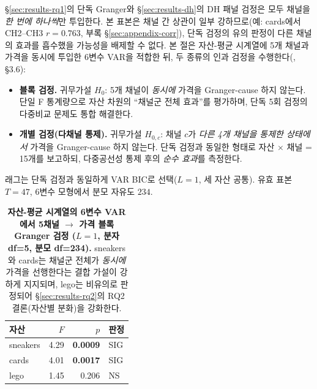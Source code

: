 \documentclass[11pt, a4paper, twocolumn]{article}
\begin{document}
\S\ref{sec:results-rq1}의 단독 Granger와 \S\ref{sec:results-dh}의 DH
패널 검정은 모두 채널을 \emph{한 번에 하나씩}만 투입한다. 본 표본은
채널 간 상관이 일부 강하므로(예: cards에서 CH2--CH3 $r=0.763$, 부록
\S\ref{sec:appendix-corr}), 단독 검정의 유의 판정이 다른 채널의 효과를
흡수했을 가능성을 배제할 수 없다. 본 절은 자산-평균 시계열에 5개 채널과
가격을 동시에 투입한 6변수 VAR을 적합한 뒤, 두 종류의 인과 검정을
수행한다(\citealp{lutkepohl2005}, §3.6):
\begin{itemize}[leftmargin=1.4em, topsep=0pt, itemsep=0pt]
  \item \textbf{블록 검정.} 귀무가설 $H_0$: 5개 채널이 \emph{동시에}
        가격을 Granger-cause 하지 않는다. 단일 F 통계량으로 자산 차원의
        ``채널군 전체 효과''를 평가하며, 단독 5회 검정의 다중비교 문제도
        통합 해결한다.
  \item \textbf{개별 검정(다채널 통제).} 귀무가설 $H_{0,c}$: 채널 $c$가
        \emph{다른 4개 채널을 통제한 상태에서} 가격을 Granger-cause 하지
        않는다. 단독 검정과 동일한 형태로 자산 $\times$ 채널 = 15개를
        보고하되, 다중공선성 통제 후의 \emph{순수 효과}를 측정한다.
\end{itemize}
래그는 단독 검정과 동일하게 VAR BIC로 선택($L=1$, 세 자산 공통).
유효 표본 $T=47$, 6변수 모형에서 분모 자유도 $234$.

\begin{table}[!t]
\centering\small
\caption[VAR 블록 검정 결과]{\textbf{자산-평균 시계열의 6변수 VAR에서
5채널 $\to$ 가격 블록 Granger 검정 ($L=1$, 분자 df=5, 분모 df=234).}
sneakers와 cards는 채널군 전체가 \emph{동시에} 가격을 선행한다는 결합
가설이 강하게 지지되며, lego는 비유의로 판정되어 \S\ref{sec:results-rq2}의
RQ2 결론(자산별 분화)을 강화한다.}
\label{tab:var_block}
\begin{tabular}{lrrl}
\toprule
자산 & $F$ & $p$ & 판정 \\
\midrule
sneakers & 4.29 & \textbf{0.0009} & SIG \\
cards    & 4.01 & \textbf{0.0017} & SIG \\
lego     & 1.45 & $0.206$        & NS \\
\bottomrule
\end{tabular}
\end{table}
\end{document}
